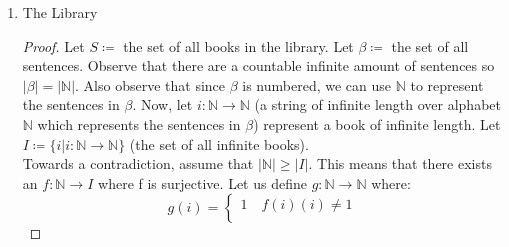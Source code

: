 \documentclass{article}
\newcommand{\union}{\cup\:}
\newcommand{\defeq}{\coloneqq}
\newcommand{\naturals}{\mathbb{N}}
\newcommand{\concat}{+\!\!\!+}
\begin{document}
\begin{enumerate}
\begin{proof}
        Let $k \in \naturals$ and let $s:k \to A$. Observe that there are $k^{|A|}$ distinct strings $s$. Let $S_k \defeq \{s|s:k \to A\}$ so as shown above $|S_k|=k^{|A|}$. Also let $S \defeq \{S_k|k \in \naturals\}$. By theorem 8.8, since $|S| \leq |\naturals|$ and $(\forall k \in \naturals) (|S_k|\leq|\naturals|)$, we know that $|\union\!\!S|\leq|\naturals|$.\\ 
        Towards a contradiction, assume that $|\union\!S|=n$ for some $n \in \naturals$. So there must be $f: n \to \union\!S$ such that $f$ is surjective. Let $a \in A$ and let $h \defeq f(0)\concat f(1)\concat...\concat f(n-1)\concat a$. Observe $|h|=\bigr(\sum_{i=0}^{n-1}|f(i)|\bigr)+1$. Thus we know that $(\forall k \in n)(|f(k)| \leq \sum_{i=0}^{n-1}|f(i)|< \bigr(\sum_{i=0}^{n-1}|f(i)|\bigr)+1=|h|$. Since $(\forall k \in n)(|f(k)|<|h|)$ we know that $(\forall k \in n)(f(k)\neq h)$. Thus we have achieved a contradiction as $h$ is a finite string over $A$ (aka $h \in \union\!S$) and $f$ does not map to $h$ so $f$ can not be surjective.\\
        Consequently, $\union\!S\neq n$ for any $n \in \naturals$ so $|\union\!S|\geq|\naturals|$. \\
        From $|\union\!S|\leq|\naturals|$ and $|\union\!S|\geq|\naturals|$, we know $|\union\!S|=|\naturals|=\aleph_0$.\\
        \textcolor{red}{There are $\aleph_0$ many finite strings over $A$.}
    \end{proof}
    \item The Library
    \begin{proof}
        Let $S\defeq$ the set of all books in the library. Let $\beta \defeq$ the set of all sentences. Observe that there are a countable infinite amount of sentences so $|\beta|=|\naturals|$. Also observe that since $\beta$ is numbered, we can use $\naturals$ to represent the sentences in $\beta$. Now, let $i:\naturals \to \naturals$ (a string of infinite length over alphabet $\naturals$ which represents the sentences in $\beta$) represent a book of infinite length. Let $I \defeq \{i|i:\naturals \to \naturals\}$ (the set of all infinite books).\\
        Towards a contradiction, assume that $|\naturals|\geq|I|$. This means that there exists an $f:\naturals \to I$ where f is surjective. Let us define $g:\naturals \to \naturals$ where:
        \[
        g(i)=
        \begin{cases}
            1 \quad f(i)(i)\neq1\\ 

\end{cases}\]
\end{proof}
\end{enumerate}
\end{document}
